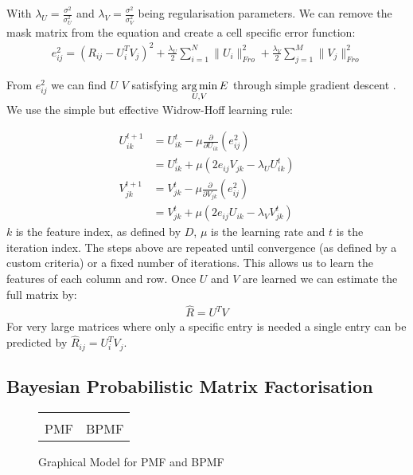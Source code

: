 With $\lambda_U = \frac{\sigma^2}{\sigma_U^2}$ and $\lambda_V = \frac{\sigma^2}{\sigma_V^2}$ being regularisation parameters. We can remove the mask matrix from the equation and create a cell specific error function:
\begin{align*}
e_{ij}^2= (R_{ij}-U_i^TV_j)^2 + \frac{\lambda_U}{2}\sum_{i=1}^{N} \|U_i\|_{Fro}^2 
+ \frac{\lambda_V}{2} \sum_{j=1}^{M} \|V_j\|_{Fro}^2
\end{align*}

From $e_{ij}^2$ we can find $U$ $V$ satisfying $\underset{U,V}{\operatorname*{arg\,min}} \, E$ through simple gradient descent \cite{nnmf-grad}. We use the simple but effective Widrow-Hoff learning rule:

\begin{align*}
U_{ik}^{t+1} &= U_{ik}^{t} - \mu \frac{\partial}{\partial U_{ik}}(e_{ij}^2) \\
&= U_{ik}^{t} + \mu (2 e_{ij}V_{jk} - \lambda_U  U_{ik}^{t})\\
V_{jk}^{t+1} &= V_{jk}^{t} - \mu \frac{\partial}{\partial V_{jk}}(e_{ij}^2) \\
&= V_{jk}^{t} + \mu (2 e_{ij}U_{ik} - \lambda_V  V_{jk}^{t})
\end{align*}
$k$ is the feature index, as defined by $D$, $\mu$ i{\tiny }s the learning rate and $t$ is the iteration index. The steps above are repeated until convergence (as defined by a custom criteria) or a fixed number of iterations. This allows us to learn the features of each column and row. Once $U$ and $V$ are learned we can estimate the full matrix by:
\begin{align}
\hat{R} = U^T V
\end{align}
For very large matrices where only a specific entry is needed a single entry can be predicted by $\hat{R}_{ij} = U_i^T V_j$.
\subsection{Bayesian Probabilistic Matrix Factorisation}
\label{sec:bpmf}
\begin{figure}[!ht]
  \begin{center}
    \begin{tabular}{cc}
       &
       \\
      PMF & BPMF
    \end{tabular}
  \end{center}
  \caption{Graphical Model for PMF and BPMF}
  \label{fig:bpmf_pmf_gm}
\end{figure}


